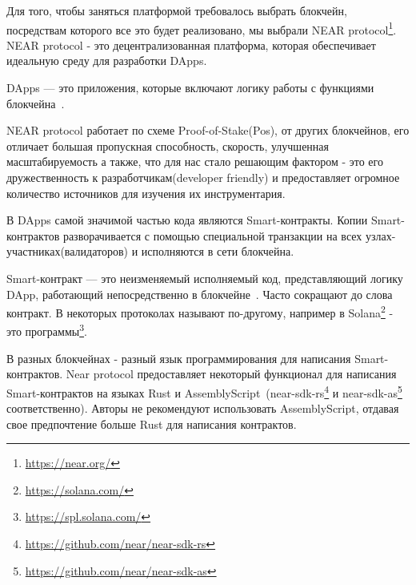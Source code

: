 
    Для того, чтобы заняться платформой требовалось выбрать блокчейн, посредствам которого все это будет реализовано, мы выбрали NEAR protocol\footnote{\url{https://near.org/}}. NEAR protocol - это децентрализованная платформа, которая обеспечивает идеальную среду для разработки DApps.
    
    \begin{definition}
        DApps --- это приложения, которые включают логику работы с функциями блокчейна~\cite{ramamurthy2020blockchain}.
    \end{definition}

    NEAR protocol работает по схеме Proof-of-Stake(Pos), от других блокчейнов, его отличает большая пропускная способность, скорость, улучшенная масштабируемость а также, что для нас стало решающим фактором - это его дружественность к разработчикам(developer friendly) и предоставляет огромное количество источников для изучения их инструментария.

    В DApps самой значимой частью кода являются Smart-контракты. Копии Smart-контрактов разворачивается с помощью специальной транзакции на всех узлах-участниках(валидаторов) и исполняются в сети блокчейна.

    \begin{definition}
        Smart-контракт --- это неизменяемый исполняемый код, представляющий логику DApp, работающий непосредственно в блокчейне~\cite{ramamurthy2020blockchain}. Часто сокращают до слова контракт. В некоторых протоколах называют по-другому, например в Solana\footnote{\url{https://solana.com/}} - это программы\footnote{\url{https://spl.solana.com/}}.
    \end{definition}

    В разных блокчейнах - разный язык программирования для написания Smart-контрактов. Near protocol предоставляет некоторый функционал для написания Smart-контрактов на языках Rust и AssemblyScript~\cite{docsnear}(near-sdk-rs\footnote{\url{https://github.com/near/near-sdk-rs}} и near-sdk-as\footnote{\url{https://github.com/near/near-sdk-as}} соответственно). Авторы не рекомендуют использовать AssemblyScript, отдавая свое предпочтение больше Rust для написания контрактов.

